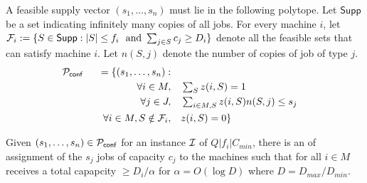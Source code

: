 \documentclass{article}[11pt]
\def\Supp{\mathsf{Supp}\xspace}
\begin{document}
\noindent
A feasible supply vector $(s_1,\ldots,s_n)$ must lie in the following polytope. Let $\Supp$ be a set indicating infinitely many copies of all jobs.
For every machine $i$, let $\calF_i :=\{S\in \Supp: |S| \leq f_i ~\textrm{ and } \sum_{j\in S} c_j \geq D_i\}$ denote all the feasible sets that can satisfy machine $i$. 
Let $n(S,j)$ denote the number of copies of job of type $j$.
\begin{alignat}{4}
	{\cal P}_\mathsf{conf} && = \{(s_1,\ldots,s_n):  && \notag \\
	&& \quad \forall i \in M,   &\quad  \textstyle \sum_{S} z(i,S)  =  1 \label{eq:conflp1} \\
	&& \quad \forall j\in J ,  &\quad  \textstyle \sum_{i\in M,S}  z(i,S)n(S,j) \le  s_j \label{eq:conflp2} \\
	&& \quad \forall i\in M, S\notin {\cal F}_i, & \quad z(i,S)  = 0 \label{eq:conflp3}  \}
\end{alignat}
\def\z{\bar z}
\begin{theorem}\label{thm:conflprounding}
	Given $(s_1,\ldots,s_n) \in {\cal P}_\mathsf{conf}$ for an instance ${\cal I}$ of $Q|f_i|C_{min}$, there is an of assignment of the $s_j$ jobs of capacity $c_j$  to the machines such that for all $i\in M$
	receives a total capapcity $\geq D_i/\alpha$ for $\alpha = O(\log D)$ where $D = D_{max}/D_{min}$.
\end{theorem}
\def\calFr{\calF^{(\alpha,\beta)}}
\end{document}
